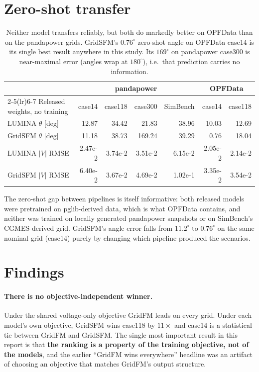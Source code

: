 \documentclass[10pt]{article}
\begin{document}
\section{Zero-shot transfer}

\begin{table}[H]
\centering
\small
\begin{tabular}{lrrrrrr}
\toprule
 & \multicolumn{4}{c}{pandapower} & \multicolumn{2}{c}{OPFData} \\
\cmidrule(lr){2-5}\cmidrule(lr){6-7}
Released weights, no training & case14 & case118 & case300 & SimBench & case14 & case118 \\
\midrule
LUMINA \(\theta\) [deg]  & 12.87 & 34.42 & 21.83 & 38.96 & 10.03 & 12.69 \\
GridSFM \(\theta\) [deg] & 11.18 & 38.73 & 169.24 & 39.29 & 0.76 & 18.04 \\
LUMINA \(|V|\) RMSE      & 2.47e-2 & 3.74e-2 & 3.51e-2 & 6.15e-2 & 2.05e-2 & 2.14e-2 \\
GridSFM \(|V|\) RMSE     & 6.40e-2 & 3.67e-2 & 4.69e-2 & 1.02e-1 & 3.35e-2 & 3.54e-2 \\
\bottomrule
\end{tabular}
\caption{Neither model transfers reliably, but both do markedly better on
OPFData than on the pandapower grids. GridSFM's \(0.76^\circ\) zero-shot angle
on OPFData case14 is its single best result anywhere in this study.
Its \(169^\circ\) on pandapower case300 is near-maximal error (angles wrap at
\(180^\circ\)), i.e.\ that prediction carries no information.}
\end{table}

The zero-shot gap between pipelines is itself informative: both released models
were pretrained on pglib-derived data, which is what OPFData contains, and
neither was trained on locally generated pandapower snapshots or on SimBench's
CGMES-derived grid. GridSFM's angle error falls from \(11.2^\circ\) to
\(0.76^\circ\) on the same nominal grid (case14) purely by changing which
pipeline produced the scenarios.

\section{Findings}

\paragraph{There is no objective-independent winner.} Under the shared
voltage-only objective GridFM leads on every grid. Under each model's own
objective, GridSFM wins case118 by \(11\times\) and case14 is a statistical tie
between GridFM and GridSFM. The single most important result in this report is
that \textbf{the ranking is a property of the training objective, not of the
models}, and the earlier ``GridFM wins everywhere'' headline was an artifact of
choosing an objective that matches GridFM's output structure.
\end{document}
